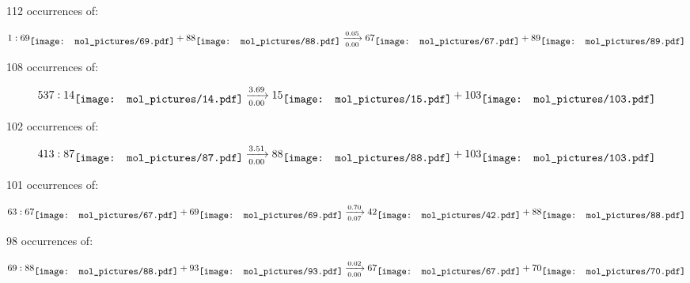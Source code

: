 \documentclass{article}
\begin{document}
112 occurrences of:

$$
1:  
69
\raisebox{-.5\height}{\texttt{[image: mol\_pictures/69.pdf]}}
+
88
\raisebox{-.5\height}{\texttt{[image: mol\_pictures/88.pdf]}}
\xrightarrow[0.00]{0.05}
67
\raisebox{-.5\height}{\texttt{[image: mol\_pictures/67.pdf]}}
+
89
\raisebox{-.5\height}{\texttt{[image: mol\_pictures/89.pdf]}}
$$



\vspace{1cm}


108 occurrences of:

$$
537:  
14
\raisebox{-.5\height}{\texttt{[image: mol\_pictures/14.pdf]}}
\xrightarrow[0.00]{3.69}
15
\raisebox{-.5\height}{\texttt{[image: mol\_pictures/15.pdf]}}
+
103
\raisebox{-.5\height}{\texttt{[image: mol\_pictures/103.pdf]}}
$$



\vspace{1cm}


102 occurrences of:

$$
413:  
87
\raisebox{-.5\height}{\texttt{[image: mol\_pictures/87.pdf]}}
\xrightarrow[0.00]{3.51}
88
\raisebox{-.5\height}{\texttt{[image: mol\_pictures/88.pdf]}}
+
103
\raisebox{-.5\height}{\texttt{[image: mol\_pictures/103.pdf]}}
$$



\vspace{1cm}


101 occurrences of:

$$
63:  
67
\raisebox{-.5\height}{\texttt{[image: mol\_pictures/67.pdf]}}
+
69
\raisebox{-.5\height}{\texttt{[image: mol\_pictures/69.pdf]}}
\xrightarrow[0.07]{0.70}
42
\raisebox{-.5\height}{\texttt{[image: mol\_pictures/42.pdf]}}
+
88
\raisebox{-.5\height}{\texttt{[image: mol\_pictures/88.pdf]}}
$$



\vspace{1cm}


98 occurrences of:

$$
69:  
88
\raisebox{-.5\height}{\texttt{[image: mol\_pictures/88.pdf]}}
+
93
\raisebox{-.5\height}{\texttt{[image: mol\_pictures/93.pdf]}}
\xrightarrow[0.00]{0.02}
67
\raisebox{-.5\height}{\texttt{[image: mol\_pictures/67.pdf]}}
+
70
\raisebox{-.5\height}{\texttt{[image: mol\_pictures/70.pdf]}}
$$
\end{document}
